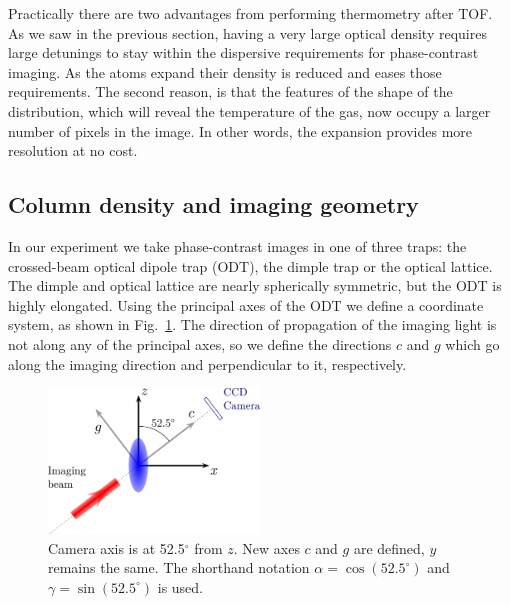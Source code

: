 Practically there are two advantages from performing thermometry after TOF.  As
we saw in the previous section, having a very large optical density requires
large detunings to stay within the dispersive requirements for phase-contrast
imaging.  As the atoms expand their density is reduced and eases those
requirements.  The second reason, is that the features of the shape of the
distribution, which will reveal the temperature of the gas,  now occupy a
larger number of pixels in the image.  In other words, the expansion provides
more resolution at no cost.  


\subsection{Column density and imaging geometry}

In our experiment we take phase-contrast images in one of three traps:  the
crossed-beam optical dipole trap (ODT), the dimple trap or the optical lattice.
The dimple and optical lattice are nearly spherically symmetric, but the ODT is
highly elongated.   Using the principal axes of the ODT we define a coordinate
system, as shown in Fig.~\ref{fig:geometry}.  The direction of propagation of
the imaging light is not along any of the principal axes, so we define the
directions $c$ and $g$ which go along the imaging direction and perpendicular
to it, respectively.  
\begin{figure}
\centering \includegraphics[width=0.5\textwidth]{../figures/fermi-thermometry/camera_setup.png}
\caption[Camera axis geometry]{Camera axis is at 52.5$^{\circ}$ from $z$.  New axes $c$ and $g$ are defined, $y$ remains the same.   The shorthand notation $\alpha = \cos(52.5^{\circ})$ and $\gamma = \sin(52.5^{\circ})$ is used.}  \label{fig:geometry}
\end{figure}

